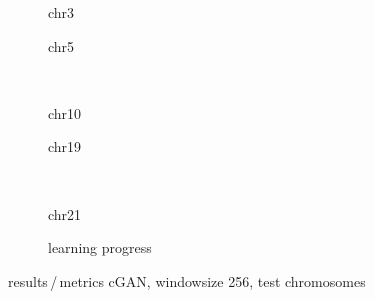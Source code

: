 \begin{figure}[p]
    \begin{subfigure}{0.45\textwidth}
        \scriptsize
        \caption{chr3}
    \end{subfigure} \hfill
    \begin{subfigure}{0.45\textwidth}
        \scriptsize
        \caption{chr5}
    \end{subfigure}\\[5mm]
    \begin{subfigure}{0.45\textwidth}
        \scriptsize
        \caption{chr10}
    \end{subfigure}\hfill
    \begin{subfigure}{0.45\textwidth}
        \scriptsize
        \caption{chr19}
    \end{subfigure}\\[3mm]
    \centering
    \begin{subfigure}{0.45\textwidth}
        \scriptsize
        \caption{chr21}
    \end{subfigure} \hfill
    \begin{subfigure}{0.45\textwidth}
        \scriptsize
        \caption{learning progress} \label{fig:results:GAN256_lossEpochs}
    \end{subfigure}
    \caption{results\,/\,metrics cGAN, windowsize 256, test chromosomes}   \label{fig:results:GAN256_pearson}
\end{figure}

